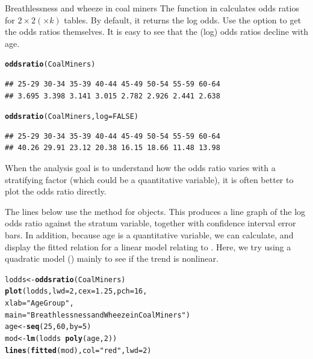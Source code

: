 \documentclass[11pt]{book}\usepackage[]{graphicx}\usepackage[]{color}
\makeatletter
\newcommand{\hlnum}[1]{\textcolor[rgb]{0.686,0.059,0.569}{#1}}%
\newcommand{\hlstr}[1]{\textcolor[rgb]{0.192,0.494,0.8}{#1}}%
\newcommand{\hlopt}[1]{\textcolor[rgb]{0,0,0}{#1}}%
\newcommand{\hlstd}[1]{\textcolor[rgb]{0.345,0.345,0.345}{#1}}%
\newcommand{\hlkwb}[1]{\textcolor[rgb]{0.69,0.353,0.396}{#1}}%
\newcommand{\hlkwc}[1]{\textcolor[rgb]{0.333,0.667,0.333}{#1}}%
\newcommand{\hlkwd}[1]{\textcolor[rgb]{0.737,0.353,0.396}{\textbf{#1}}}%
\newenvironment{kframe}{%
 \def\at@end@of@kframe{}%
 \ifinner\ifhmode%
  \def\at@end@of@kframe{\end{minipage}}%
  \begin{minipage}{\columnwidth}%
 \fi\fi%
 \def\FrameCommand##1{\hskip\@totalleftmargin \hskip-\fboxsep
 \colorbox{shadecolor}{##1}\hskip-\fboxsep
     \hskip-\linewidth \hskip-\@totalleftmargin \hskip\columnwidth}%
 \MakeFramed {\advance\hsize-\width
   \@totalleftmargin\z@ \linewidth\hsize
   \@setminipage}}%
 {\par\unskip\endMakeFramed%
 \at@end@of@kframe}
\newenvironment{knitrout}{}{} %
\renewenvironment{knitrout}{\small\renewcommand{\baselinestretch}{.85}}{} %
\makeatother
\begin{document}
\begin{Example}[wheeze1]{Breathlessness and wheeze in coal miners}
The  function in  calculates odds ratios
for $2 \times 2 (\times k)$ tables.  By default, it returns the
log odds.  Use the option  to get the odds ratios
themselves.  It is easy to see that the (log) odds ratios decline
with age.
\begin{knitrout}
\color{fgcolor}\begin{kframe}
\begin{alltt}
\hlkwd{oddsratio}\hlstd{(CoalMiners)}
\end{alltt}
\begin{verbatim}
## 25-29 30-34 35-39 40-44 45-49 50-54 55-59 60-64 
## 3.695 3.398 3.141 3.015 2.782 2.926 2.441 2.638
\end{verbatim}
\begin{alltt}
\hlkwd{oddsratio}\hlstd{(CoalMiners,} \hlkwc{log}\hlstd{=}\hlnum{FALSE}\hlstd{)}
\end{alltt}
\begin{verbatim}
## 25-29 30-34 35-39 40-44 45-49 50-54 55-59 60-64 
## 40.26 29.91 23.12 20.38 16.15 18.66 11.48 13.98
\end{verbatim}
\end{kframe}
\end{knitrout}

When the analysis goal is to understand how the odds ratio varies
with a stratifying factor (which could be a quantitative variable),
it is often better to plot the odds ratio directly. 

The lines below
use the  method for  objects.
This produces a line graph of the log odds ratio against the 
stratum variable, together with confidence interval error bars.
In addition, because age is a quantitative variable, we can
calculate, and display the fitted relation for a linear model
relating  to .  Here, we try using a
quadratic model () mainly to see if the
trend is nonlinear.
\begin{knitrout}
\color{fgcolor}\begin{kframe}
\begin{alltt}
\hlstd{lodds} \hlkwb{<-} \hlkwd{oddsratio}\hlstd{(CoalMiners)}
\hlkwd{plot}\hlstd{(lodds,} \hlkwc{lwd}\hlstd{=}\hlnum{2}\hlstd{,} \hlkwc{cex}\hlstd{=}\hlnum{1.25}\hlstd{,} \hlkwc{pch}\hlstd{=}\hlnum{16}\hlstd{,}
     \hlkwc{xlab} \hlstd{=} \hlstr{"Age Group"}\hlstd{,}
     \hlkwc{main} \hlstd{=} \hlstr{"Breathlessness and Wheeze in Coal Miners"}\hlstd{)}
\hlstd{age} \hlkwb{<-} \hlkwd{seq}\hlstd{(}\hlnum{25}\hlstd{,} \hlnum{60}\hlstd{,} \hlkwc{by} \hlstd{=} \hlnum{5}\hlstd{)}
\hlstd{mod} \hlkwb{<-} \hlkwd{lm}\hlstd{(lodds} \hlopt{~} \hlkwd{poly}\hlstd{(age,} \hlnum{2}\hlstd{))}
\hlkwd{lines}\hlstd{(}\hlkwd{fitted}\hlstd{(mod),} \hlkwc{col} \hlstd{=} \hlstr{"red"}\hlstd{,} \hlkwc{lwd}\hlstd{=}\hlnum{2}\hlstd{)}
\end{alltt}
\end{kframe}\begin{figure}[htbp]



\end{figure}
\end{knitrout}
\end{Example}
\end{document}
